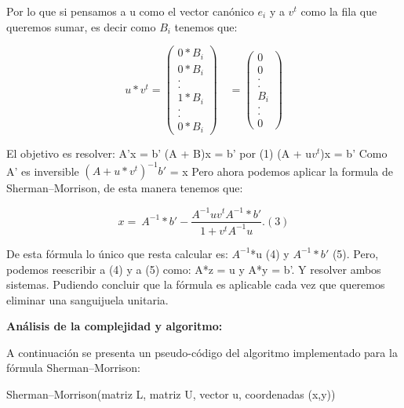 \begin{itemize}
Por lo que si pensamos a u como el vector canónico $e_i$ y a $v^t$ como la fila que queremos sumar, es decir como $B_i$ tenemos que:


$$
u*v^t=
\begin{pmatrix} 
0*B_i\\
0*B_i\\
.\\
.\\
1*B_i\\
.\\
.\\
0*B_i
\end{pmatrix}
\quad 
=
\begin{pmatrix} 
0\\
0\\
.\\
.\\
B_i\\
.\\
.\\
0
\end{pmatrix}
$$

El objetivo es resolver:\newline
A'x = b'\newline 
(A + B)x = b' por (1) \newline
(A + u$v^t$)x  = b'\newline
Como A' es inversible
$(A + u*v^t)^{-1}b'$ = x\newline
Pero ahora podemos aplicar la formula de Sherman–Morrison, de esta manera tenemos que: 

\begin{equation}
x =\ A^{-1}*b' - \frac{ A^{-1} u v^t A^{-1}*b'}{1+v^t A^{-1}u}.\label{eq:sm}(3)
\end{equation} 

De esta fórmula lo único que resta calcular es: $A^{-1}$*u (4) y $A^{-1}*b'$ (5).\newline
Pero, podemos reescribir a (4) y a (5) como:\newline
 A*z = u y A*y = b'. Y resolver ambos sistemas. Pudiendo concluir que la fórmula es aplicable cada vez que queremos eliminar una sanguijuela unitaria. \newline
 
 
\textbf{Análisis de la complejidad y algoritmo:} \newline

A continuación se presenta un pseudo-código del algoritmo implementado para la fórmula Sherman–Morrison:

 \begin{algorithm}[H]
\caption{Sherman–Morrison(matriz L, matriz U, vector u, coordenadas (x,y))}
\begin{algorithmic}[1]


\end{algorithmic}
\end{algorithm}
\end{itemize}
